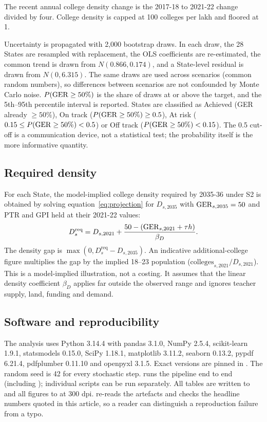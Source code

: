 The recent annual college density change is the 2017-18 to 2021-22 change divided by four. College density is capped at 100 colleges per lakh and floored at 1.

Uncertainty is propagated with 2,000 bootstrap draws. In each draw, the 28 States are resampled with replacement, the OLS coefficients are re-estimated, the common trend is drawn from \(N(0.866, 0.174)\), and a State-level residual is drawn from \(N(0, 6.315)\). The same draws are used across scenarios (common random numbers), so differences between scenarios are not confounded by Monte Carlo noise. \(P(\mathrm{GER} \ge 50\%)\) is the share of draws at or above the target, and the 5th--95th percentile interval is reported. States are classified as Achieved (GER already \(\ge 50\%\)), On track (\(P(\mathrm{GER} \ge 50\%) \ge 0.5\)), At risk (\(0.15 \le P(\mathrm{GER} \ge 50\%) < 0.5\)) or Off track (\(P(\mathrm{GER} \ge 50\%) < 0.15\)). The 0.5 cut-off is a communication device, not a statistical test; the probability itself is the more informative quantity.

\subsection{Required density}

For each State, the model-implied college density required by 2035-36 under S2 is obtained by solving equation~\eqref{eq:projection} for \(D_{s,2035}\) with \(\mathrm{GER}_{s,2035} = 50\) and PTR and GPI held at their 2021-22 values:
\begin{equation}
D_s^{\text{req}} = D_{s,2021} + \frac{50 - \left(\mathrm{GER}_{s,2021} + \tau h\right)}{\beta_D}.
\label{eq:required}
\end{equation}
The density gap is \(\max(0, D_s^{\text{req}} - D_{s,2035})\). An indicative additional-college figure multiplies the gap by the implied 18--23 population (\(\text{colleges}_{s,2021} / D_{s,2021}\)). This is a model-implied illustration, not a costing. It assumes that the linear density coefficient \(\beta_D\) applies far outside the observed range and ignores teacher supply, land, funding and demand.

\subsection{Software and reproducibility}

The analysis uses Python 3.14.4 with pandas 3.1.0, NumPy 2.5.4, scikit-learn 1.9.1, statsmodels 0.15.0, SciPy 1.18.1, matplotlib 3.11.2, seaborn 0.13.2, pypdf 6.21.4, pdfplumber 0.11.10 and openpyxl 3.1.5. Exact versions are pinned in . The random seed is 42 for every stochastic step.  runs the pipeline end to end (including ); individual scripts can be run separately. All tables are written to  and all figures to  at 300 dpi.  re-reads the artefacts and checks the headline numbers quoted in this article, so a reader can distinguish a reproduction failure from a typo.

